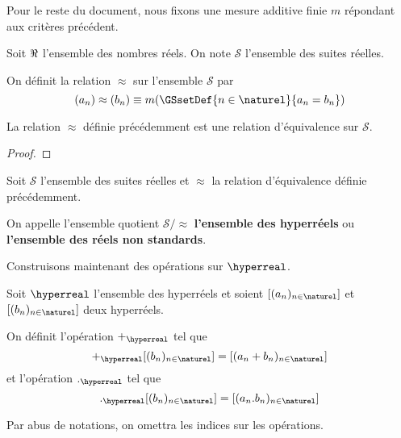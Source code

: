 \documentclass[a4paper, 12pt]{report}
\begin{document}
Pour le reste du document, nous fixons une mesure additive finie $m$ répondant
aux critères précédent.

\begin{notation}
	Soit $\real$ l'ensemble des nombres réels. On note $\mathcal{S}$ l'ensemble
	des suites réelles.
\end{notation}

\begin{definition}
	On définit la relation $\approx$ sur l'ensemble $\mathcal{S}$ par
	\begin{equation}
		(a_{n}) \approx (b_{n}) \equiv m(\GSsetDef{n \in \naturel}{a_{n} = b_{n}})
	\end{equation}
\end{definition}

\begin{proposition}
	La relation $\approx$ définie précédemment est une relation d'équivalence sur
	$\mathcal{S}$.
\end{proposition}

\ifdefined\outputproof
\begin{proof}

\end{proof}
\fi

\begin{definition}
	Soit $\mathcal{S}$ l'ensemble des suites réelles et $\approx$ la relation
	d'équivalence définie précédemment.

	On appelle l'ensemble quotient $\mathcal{S} / \approx$ \textbf{l'ensemble des hyperréels} ou
	\textbf{l'ensemble des réels non standards}.
\end{definition}

Construisons maintenant des opérations sur $\hyperreal$.

\begin{definition}
	Soit $\hyperreal$ l'ensemble des hyperréels et soient $[(a_{n})_{n \in
	\naturel}]$ et $[(b_{n})_{n \in \naturel}]$ deux hyperréels.

	On définit l'opération $+_{\hyperreal}$ tel que
	\begin{equation}
		[(a_{n})_{n \in \naturel}] +_{\hyperreal} [(b_{n})_{n \in \naturel}] = [(a_{n} +
		b_{n})_{n \in \naturel}]
	\end{equation}
	et l'opération $._{\hyperreal}$ tel que
	\begin{equation}
		[(a_{n})_{n \in \naturel}] ._{\hyperreal}  [(b_{n})_{n \in \naturel}] =
		[(a_{n} .
		b_{n})_{n \in \naturel}]
	\end{equation}

	Par abus de notations, on omettra les indices sur les opérations.
\end{definition}
\end{document}
